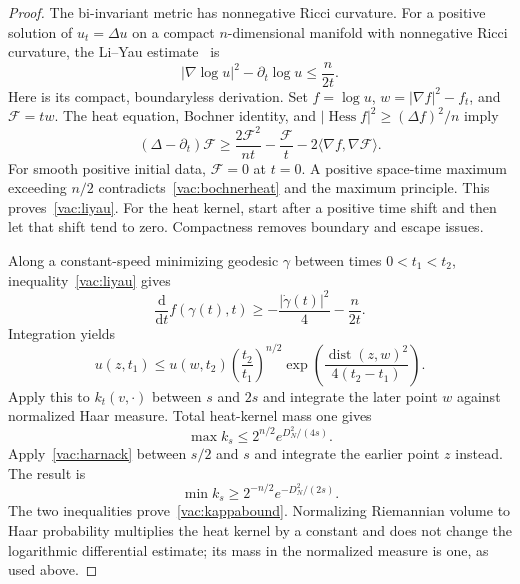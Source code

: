 \begin{proof}
The bi-invariant metric has nonnegative Ricci curvature.  For a positive
solution of $u_t=\Delta u$ on a compact $n$-dimensional manifold with
nonnegative Ricci curvature, the Li--Yau estimate~\cite{LiYau} is
\begin{equation}
 |\nabla\log u|^2-\partial_t\log u\leq\frac{n}{2t}.
 \label{vac:liyau}
\end{equation}
Here is its compact, boundaryless derivation.  Set $f=\log u$,
$w=|\nabla f|^2-f_t$, and $\mathcal F=tw$.  The heat equation, Bochner
identity, and $|\operatorname{Hess}f|^2\geq(\Delta f)^2/n$ imply
\begin{equation}
 (\Delta-\partial_t)\mathcal F
 \geq\frac{2\mathcal F^2}{nt}-\frac{\mathcal F}{t}
       -2\langle\nabla f,\nabla\mathcal F\rangle.
 \label{vac:bochnerheat}
\end{equation}
For smooth positive initial data, $\mathcal F=0$ at $t=0$.  A positive
space-time maximum exceeding $n/2$ contradicts~\eqref{vac:bochnerheat}
and the maximum principle.  This proves~\eqref{vac:liyau}.  For the heat
kernel, start after a positive time shift and then let that shift tend to
zero.  Compactness removes boundary and escape issues.

Along a constant-speed minimizing geodesic $\gamma$ between times
$0<t_1<t_2$, inequality~\eqref{vac:liyau} gives
\[
 \frac{\mathrm d}{\mathrm dt}f(\gamma(t),t)
 \geq-\frac{|\dot\gamma(t)|^2}{4}-\frac{n}{2t}.
\]
Integration yields
\begin{equation}
 u(z,t_1)\leq u(w,t_2)
       \left(\frac{t_2}{t_1}\right)^{n/2}
       \exp\!\left(\frac{\operatorname{dist}(z,w)^2}
                         {4(t_2-t_1)}\right).
 \label{vac:harnack}
\end{equation}
Apply this to $k_t(v,\cdot)$ between $s$ and $2s$ and integrate the later
point $w$ against normalized Haar measure.  Total heat-kernel mass one gives
\begin{equation}
 \max k_s\leq 2^{n/2}e^{D_N^2/(4s)}.
 \label{vac:heatupper}
\end{equation}
Apply~\eqref{vac:harnack} between $s/2$ and $s$ and integrate the earlier
point $z$ instead.  The result is
\begin{equation}
 \min k_s\geq2^{-n/2}e^{-D_N^2/(2s)}.
 \label{vac:heatlower}
\end{equation}
The two inequalities prove~\eqref{vac:kappabound}.  Normalizing Riemannian
volume to Haar probability multiplies the heat kernel by a constant and
does not change the logarithmic differential estimate; its mass in the
normalized measure is one, as used above.
\end{proof}

